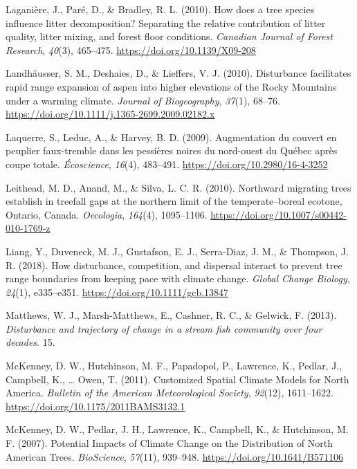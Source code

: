 \documentclass[a4paperpaper,]{article}
\begin{document}
\leavevmode\hypertarget{ref-laganiere_how_2010}{}%
Laganière, J., Paré, D., \& Bradley, R. L. (2010). How does a tree
species influence litter decomposition? Separating the relative
contribution of litter quality, litter mixing, and forest floor
conditions. \emph{Canadian Journal of Forest Research}, \emph{40}(3),
465--475. \url{https://doi.org/10.1139/X09-208}

\leavevmode\hypertarget{ref-landhausser_disturbance_2010}{}%
Landhäusser, S. M., Deshaies, D., \& Lieffers, V. J. (2010). Disturbance
facilitates rapid range expansion of aspen into higher elevations of the
Rocky Mountains under a warming climate. \emph{Journal of Biogeography},
\emph{37}(1), 68--76.
\url{https://doi.org/10.1111/j.1365-2699.2009.02182.x}

\leavevmode\hypertarget{ref-laquerre_augmentation_2009}{}%
Laquerre, S., Leduc, A., \& Harvey, B. D. (2009). Augmentation du
couvert en peuplier faux-tremble dans les pessières noires du nord-ouest
du Québec après coupe totale. \emph{Écoscience}, \emph{16}(4), 483--491.
\url{https://doi.org/10.2980/16-4-3252}

\leavevmode\hypertarget{ref-leithead_northward_2010}{}%
Leithead, M. D., Anand, M., \& Silva, L. C. R. (2010). Northward
migrating trees establish in treefall gaps at the northern limit of the
temperate--boreal ecotone, Ontario, Canada. \emph{Oecologia},
\emph{164}(4), 1095--1106.
\url{https://doi.org/10.1007/s00442-010-1769-z}

\leavevmode\hypertarget{ref-liang_how_2018}{}%
Liang, Y., Duveneck, M. J., Gustafson, E. J., Serra-Diaz, J. M., \&
Thompson, J. R. (2018). How disturbance, competition, and dispersal
interact to prevent tree range boundaries from keeping pace with climate
change. \emph{Global Change Biology}, \emph{24}(1), e335--e351.
\url{https://doi.org/10.1111/gcb.13847}

\leavevmode\hypertarget{ref-matthews_disturbance_2013}{}%
Matthews, W. J., Marsh-Matthews, E., Cashner, R. C., \& Gelwick, F.
(2013). \emph{Disturbance and trajectory of change in a stream ﬁsh
community over four decades}. 15.

\leavevmode\hypertarget{ref-mckenney_customized_2011}{}%
McKenney, D. W., Hutchinson, M. F., Papadopol, P., Lawrence, K., Pedlar,
J., Campbell, K., \ldots{} Owen, T. (2011). Customized Spatial Climate
Models for North America. \emph{Bulletin of the American Meteorological
Society}, \emph{92}(12), 1611--1622.
\url{https://doi.org/10.1175/2011BAMS3132.1}

\leavevmode\hypertarget{ref-mckenney_potential_2007}{}%
McKenney, D. W., Pedlar, J. H., Lawrence, K., Campbell, K., \&
Hutchinson, M. F. (2007). Potential Impacts of Climate Change on the
Distribution of North American Trees. \emph{BioScience}, \emph{57}(11),
939--948. \url{https://doi.org/10.1641/B571106}
\end{document}
